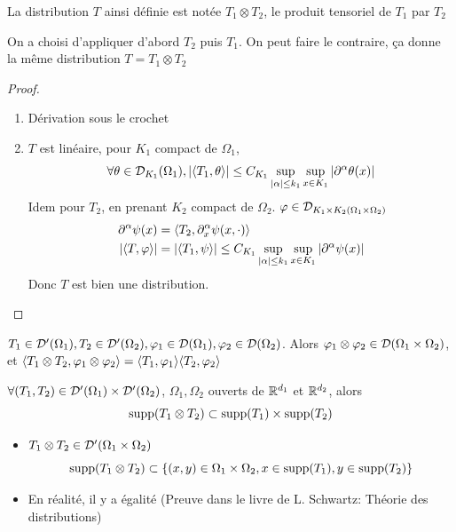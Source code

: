 \documentclass[]{report}
\begin{document}
    \begin{df}{}{}
        La distribution $T$ ainsi définie est notée $T_1\otimes T_2$, le produit tensoriel de $T_1$ par $T_2$
    \end{df}
    
    \begin{re}{}{}
        On a choisi d'appliquer d'abord $T_2$ puis $T_1$. On peut faire le contraire, ça donne la même distribution $T=T_1\otimes T_2$
    \end{re}

    \begin{proof}
        \begin{enumerate}
            \item Dérivation sous le crochet
            \item $T$ est linéaire, pour $K_1$ compact de $\Omega_1$,
            \[\forall \theta \in \mathcal{D}_{K_1}(\Omega_1),|\langle T_1,\theta \rangle|\le C_{K_1}\sup_{|\alpha|\le k_1}\sup_{x\in K_1}|\partial^\alpha \theta(x)|\]
            Idem pour $T_2$, en prenant $K_2$ compact de $\Omega_2$. $\varphi\in \mathcal{D}_{K_1\times K_2(\Omega_1\times \Omega_2)}$
            \begin{align*}
                \partial^\alpha\psi(x)&=\langle T_2,\partial_x^{\alpha}\psi(x,\cdot) \rangle\\
                |\langle T,\varphi \rangle|&=|\langle T_1,\psi \rangle|\le C_{K_1}\sup_{|\alpha|\le k_1}\sup_{x\in K_1}|\partial^{\alpha}\psi(x)|
            \end{align*}
            Donc $T$ est bien une distribution.
        \end{enumerate}
    \end{proof}

    \begin{prop}{}{}
        $T_1\in \mathcal{D}'(\Omega_1),T_2\in \mathcal{D}'(\Omega_2),\varphi_1\in \mathcal{D}(\Omega_1),\varphi_2\in \mathcal{D}(\Omega_2)$. Alors $\varphi_1\otimes \varphi_2\in \mathcal{D}(\Omega_1\times \Omega_2)$, et $\langle T_1\otimes T_2,\varphi_1\otimes \varphi_2 \rangle=\langle T_1,\varphi_1 \rangle\langle T_2,\varphi_2 \rangle$
    \end{prop}

    \begin{prop}{}{}
        $\forall (T_1,T_2)\in \mathcal{D}'(\Omega_1)\times \mathcal{D}'(\Omega_2)$, $\Omega_1,\Omega_2$ ouverts de $\mathbb{R}^{d_1}$ et $\mathbb{R}^{d_2}$, alors
        \[\text{supp}(T_1\otimes T_2)\subset \text{supp}(T_1)\times \text{supp}(T_2)\]
    \end{prop}

    \begin{re}{}{}
        \begin{itemize}
            \item $T_1\otimes T_2\in \mathcal{D}'(\Omega_1\times \Omega_2)$
            \[\text{supp}(T_1\otimes T_2)\subset \{(x,y)\in \Omega_1\times \Omega_2,x\in \text{supp}(T_1),y\in\text{supp}(T_2)\}\]
            \item En réalité, il y a égalité (Preuve dans le livre de L. Schwartz: Théorie des distributions)
        \end{itemize}
    \end{re}
\end{document}
